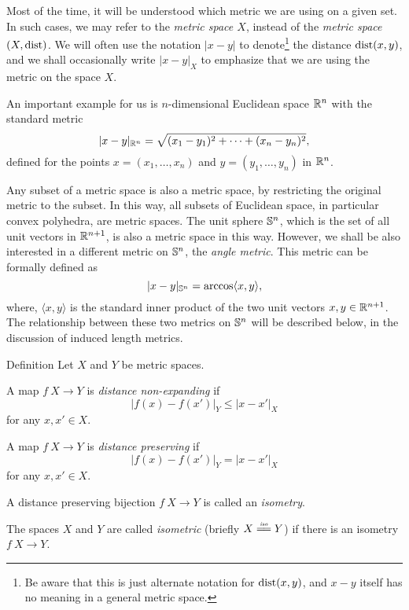 Most of the time, it will be understood which metric we are using on a given set.
In such cases, we may refer to the \emph{metric space $X$}, instead of the \emph{metric space $(X,\operatorname{dist})$}.
We will often use the notation $|x-y|$ to denote\footnote{Be aware that this is just alternate notation for $\operatorname{dist}(x,y)$, and $x - y$ itself has no meaning in a general metric space.} the distance $\operatorname{dist}(x,y)$, and we shall occasionally write $|x-y|_X$ to emphasize that we are using the metric on the space $X$.

An important example for us is $n$-dimensional Euclidean space $\mathbb{R}^n$ with the standard metric
\[|x-y|_{\mathbb{R}^n} = \sqrt{(x_1 - y_1)^2+\dots+(x_n - y_n)^2},\]
defined for the points $x = (x_1, \ldots , x_n)$ and $y = (y_1, \ldots , y_n)$ in $\mathbb{R}^n$.

Any subset of a metric space is also a metric space, by restricting the original metric to the subset.  In this way, all subsets of Euclidean space, in particular convex polyhedra,
are metric spaces.
The unit sphere $\mathbb{S}^n$, which is the set of all unit vectors in $\mathbb{R}^{n+1}$, is also a metric space in this way.  
However, we shall be also interested in a different metric on $\mathbb{S}^n$, the \emph{angle metric}.\label{angle-metric}
This metric can be formally defined as
\[ |x - y|_{\mathbb{S}^n} = \arccos\langle x, y\rangle,\]  
where, $\langle x, y \rangle$ is the standard inner product of the two unit vectors $x, y \in \mathbb{R}^{n+1}$.
The relationship between these two metrics on $\mathbb{S}^n$ will be described below, in the discussion of induced length metrics.

\begin{thm}{Definition}
Let $X$ and $Y$ be metric spaces.
\begin{subthm}{}
A map $f\:X\to Y$ is \emph{distance non-expanding} if
$$|f(x)-f(x')|_Y\le |x-x'|_X$$
for any $x,x'\in X$.
\end{subthm}

\begin{subthm}{}
A map $f\:X\to Y$ is \emph{distance preserving} if
$$|f(x)-f(x')|_Y= |x-x'|_X$$
for any $x,x'\in X$.
\end{subthm}

\begin{subthm}{}
A distance preserving bijection $f\:X\to Y$ is called an \emph{isometry}.
\end{subthm}

\begin{subthm}{}
The spaces $X$ and $Y$ are called \emph{isometric} (briefly $X\iso Y$)
 if there is an isometry  $f\:X\to Y$.
\end{subthm}

\end{thm}


